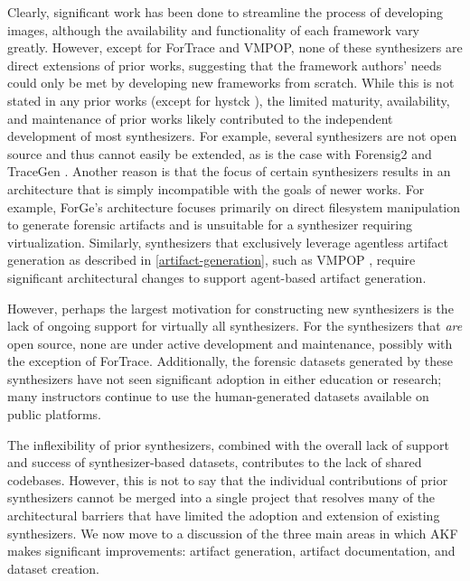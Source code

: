 \documentclass[final,5p,times,twocolumn]{elsarticle}
\begin{document}
Clearly, significant work has been done to streamline the process of
developing images, although the availability and functionality of each
framework vary greatly. However, except for ForTrace and VMPOP, none of
these synthesizers are direct extensions of prior works, suggesting that
the framework authors' needs could only be met by developing new
frameworks from scratch. While this is not stated in any prior works
(except for hystck \cite{gobelNovelApproachGenerating2020}), the
limited maturity, availability, and maintenance of prior works likely
contributed to the independent development of most synthesizers. For
example, several synthesizers are not open source and thus cannot easily
be extended, as is the case with Forensig2
\cite{mochForensicImageGenerator2009} and TraceGen
\cite{duTraceGenUserActivity2021}. Another reason is that the focus
of certain synthesizers results in an architecture that is simply
incompatible with the goals of newer works. For example, ForGe's
architecture \cite{vistiAutomaticCreationComputer2015} focuses
primarily on direct filesystem manipulation to generate forensic
artifacts and is unsuitable for a synthesizer requiring virtualization.
Similarly, synthesizers that exclusively leverage agentless artifact
generation as described in \autoref{artifact-generation}, such as
VMPOP \cite{parkTREDEVMPOPCultivating2018}, require significant
architectural changes to support agent-based artifact generation.

However, perhaps the largest motivation for constructing new
synthesizers is the lack of ongoing support for virtually all
synthesizers. For the synthesizers that \emph{are} open source, none are
under active development and maintenance, possibly with the exception of
ForTrace. Additionally, the forensic datasets generated by these
synthesizers have not seen significant adoption in either education or
research; many instructors continue to use the human-generated datasets
available on public platforms.

The inflexibility of prior synthesizers, combined with the overall lack
of support and success of synthesizer-based datasets, contributes to the
lack of shared codebases. However, this is not to say that the
individual contributions of prior synthesizers cannot be merged into a
single project that resolves many of the architectural barriers that
have limited the adoption and extension of existing synthesizers. We now
move to a discussion of the three main areas in which AKF makes
significant improvements: artifact generation, artifact documentation,
and dataset creation.
\end{document}

